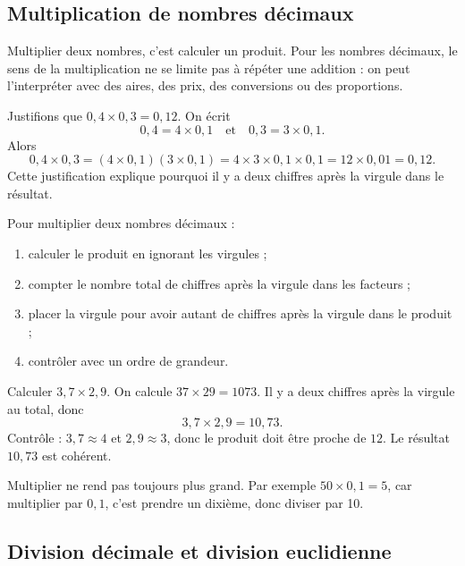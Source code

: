 \documentclass[11pt,a4paper]{article}
\begin{document}
\subsection{Multiplication de nombres décimaux}

\begin{definitionbox}
Multiplier deux nombres, c'est calculer un produit. Pour les nombres décimaux, le sens de la multiplication ne se limite pas à répéter une addition : on peut l'interpréter avec des aires, des prix, des conversions ou des proportions.
\end{definitionbox}

\begin{preuvebox}
Justifions que \(0,4\times0,3=0,12\). On écrit
\[
0,4=4\times0,1 \quad \text{et} \quad 0,3=3\times0,1.
\]
Alors
\[
0,4\times0,3=(4\times0,1)(3\times0,1)=4\times3\times0,1\times0,1=12\times0,01=0,12.
\]
Cette justification explique pourquoi il y a deux chiffres après la virgule dans le résultat.
\end{preuvebox}

\begin{methodbox}
Pour multiplier deux nombres décimaux :
\begin{enumerate}[label=\arabic*)]
\item calculer le produit en ignorant les virgules ;
\item compter le nombre total de chiffres après la virgule dans les facteurs ;
\item placer la virgule pour avoir autant de chiffres après la virgule dans le produit ;
\item contrôler avec un ordre de grandeur.
\end{enumerate}
\end{methodbox}

\begin{exemplebox}
Calculer \(3,7\times2,9\). On calcule \(37\times29=1073\). Il y a deux chiffres après la virgule au total, donc
\[
3,7\times2,9=10,73.
\]
Contrôle : \(3,7\approx4\) et \(2,9\approx3\), donc le produit doit être proche de \(12\). Le résultat \(10,73\) est cohérent.
\end{exemplebox}

\begin{erreurbox}
Multiplier ne rend pas toujours plus grand. Par exemple \(50\times0,1=5\), car multiplier par \(0,1\), c'est prendre un dixième, donc diviser par 10.
\end{erreurbox}

\subsection{Division décimale et division euclidienne}
\end{document}
